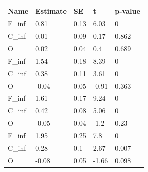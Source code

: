 \begin{tabular}{lllll}
Name & Estimate & SE & t & p-value \\ 
\hline 
F_{inf} & 0.81 & 0.13 & 6.03 & 0 \\ 
C_{inf} & 0.01 & 0.09 & 0.17 & 0.862 \\ 
O & 0.02 & 0.04 & 0.4 & 0.689 \\ 
F_{inf} & 1.54 & 0.18 & 8.39 & 0 \\ 
C_{inf} & 0.38 & 0.11 & 3.61 & 0 \\ 
O & -0.04 & 0.05 & -0.91 & 0.363 \\ 
F_{inf} & 1.61 & 0.17 & 9.24 & 0 \\ 
C_{inf} & 0.42 & 0.08 & 5.06 & 0 \\ 
O & -0.05 & 0.04 & -1.2 & 0.23 \\ 
F_{inf} & 1.95 & 0.25 & 7.8 & 0 \\ 
C_{inf} & 0.28 & 0.1 & 2.67 & 0.007 \\ 
O & -0.08 & 0.05 & -1.66 & 0.098 \\ 
\hline 
\end{tabular}